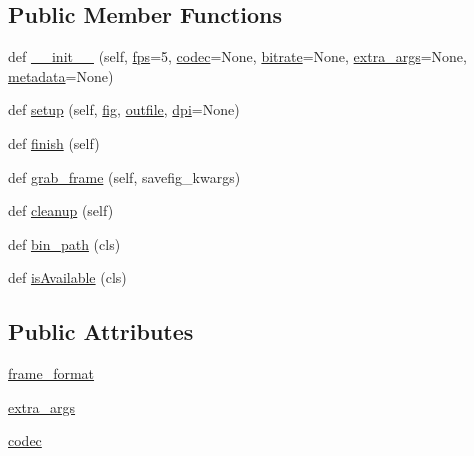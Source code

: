 \subsection*{Public Member Functions}
\begin{DoxyCompactItemize}
\item 
def \hyperlink{classmatplotlib_1_1animation_1_1MovieWriter_ae01612a4e3ba22aa48d17bec8de1bb62}{\+\_\+\+\_\+init\+\_\+\+\_\+} (self, \hyperlink{classmatplotlib_1_1animation_1_1AbstractMovieWriter_aaf7656da4e1f760b64f453cffbe15a82}{fps}=5, \hyperlink{classmatplotlib_1_1animation_1_1MovieWriter_a58c85e59e54995fbe71588aa6a2a4b08}{codec}=None, \hyperlink{classmatplotlib_1_1animation_1_1AbstractMovieWriter_a8437f6e4c409bdd6392b1d354e9bc4c5}{bitrate}=None, \hyperlink{classmatplotlib_1_1animation_1_1MovieWriter_a04961dd29276d116758c5ba8229b32f2}{extra\+\_\+args}=None, \hyperlink{classmatplotlib_1_1animation_1_1AbstractMovieWriter_a5a23958781c90f0aae7ac29ef6a7401f}{metadata}=None)
\item 
def \hyperlink{classmatplotlib_1_1animation_1_1MovieWriter_a9b6d5f0e33e492d46c74b0eff368d5b2}{setup} (self, \hyperlink{classmatplotlib_1_1animation_1_1AbstractMovieWriter_a835eff7e0ac625992e7f708448e88fa6}{fig}, \hyperlink{classmatplotlib_1_1animation_1_1AbstractMovieWriter_ae2006c1ca69618ec02514264a9f318e1}{outfile}, \hyperlink{classmatplotlib_1_1animation_1_1AbstractMovieWriter_aaca5ed6ef95c99e03830b346425ee9bc}{dpi}=None)
\item 
def \hyperlink{classmatplotlib_1_1animation_1_1MovieWriter_a6622232a5fc44d900011f61f6cd000fa}{finish} (self)
\item 
def \hyperlink{classmatplotlib_1_1animation_1_1MovieWriter_af03dcd4f214dd62db590c1abd116f618}{grab\+\_\+frame} (self, savefig\+\_\+kwargs)
\item 
def \hyperlink{classmatplotlib_1_1animation_1_1MovieWriter_a8ffc7e3a0acb51f826ae98e9abfb3ba8}{cleanup} (self)
\item 
def \hyperlink{classmatplotlib_1_1animation_1_1MovieWriter_a82b63a3c5e363a36634f0b28fd47b3a7}{bin\+\_\+path} (cls)
\item 
def \hyperlink{classmatplotlib_1_1animation_1_1MovieWriter_a38835f741535e08dd7a5b3ed1e771324}{is\+Available} (cls)
\end{DoxyCompactItemize}
\subsection*{Public Attributes}
\begin{DoxyCompactItemize}
\item 
\hyperlink{classmatplotlib_1_1animation_1_1MovieWriter_a52d890850839781e09ad50717b00087b}{frame\+\_\+format}
\item 
\hyperlink{classmatplotlib_1_1animation_1_1MovieWriter_a04961dd29276d116758c5ba8229b32f2}{extra\+\_\+args}
\item 
\hyperlink{classmatplotlib_1_1animation_1_1MovieWriter_a58c85e59e54995fbe71588aa6a2a4b08}{codec}
\end{DoxyCompactItemize}
